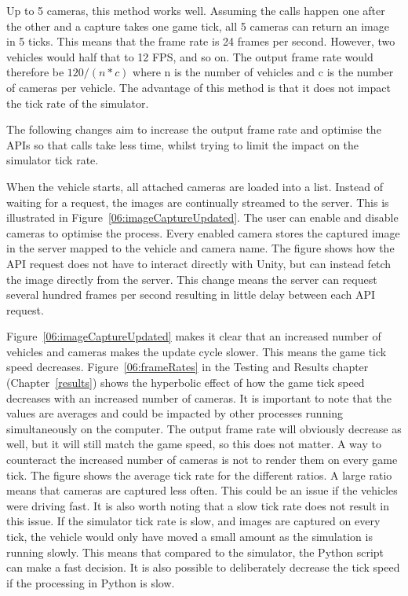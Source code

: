 Up to 5 cameras, this method works well. Assuming the calls happen one after the other and a capture takes one game tick, all 5 cameras can return an image in 5 ticks. This means that the frame rate is 24 frames per second. However, two vehicles would half that to 12 FPS, and so on. The output frame rate would therefore be $120/(n*c)$ where n is the number of vehicles and c is the number of cameras per vehicle. The advantage of this method is that it does not impact the tick rate of the simulator. 

The following changes aim to increase the output frame rate and optimise the APIs so that calls take less time, whilst trying to limit the impact on the simulator tick rate. 

When the vehicle starts, all attached cameras are loaded into a list. Instead of waiting for a request, the images are continually streamed to the server. This is illustrated in Figure~\ref{06:imageCaptureUpdated}. The user can enable and disable cameras to optimise the process. Every enabled camera stores the captured image in the server mapped to the vehicle and camera name. The figure shows how the API request does not have to interact directly with Unity, but can instead fetch the image directly from the server. This change means the server can request several hundred frames per second resulting in little delay between each API request. 

Figure~\ref{06:imageCaptureUpdated} makes it clear that an increased number of vehicles and cameras makes the update cycle slower. This means the game tick speed decreases. Figure~\ref{06:frameRates} in the Testing and Results chapter (Chapter~\ref{results}) shows the hyperbolic effect of how the game tick speed decreases with an increased number of cameras. It is important to note that the values are averages and could be impacted by other processes running simultaneously on the computer. The output frame rate will obviously decrease as well, but it will still match the game speed, so this does not matter. A way to counteract the increased number of cameras is not to render them on every game tick. The figure shows the average tick rate for the different ratios. A large ratio means that cameras are captured less often. This could be an issue if the vehicles were driving fast. It is also worth noting that a slow tick rate does not result in this issue. If the simulator tick rate is slow, and images are captured on every tick, the vehicle would only have moved a small amount as the simulation is running slowly. This means that compared to the simulator, the Python script can make a fast decision. It is also possible to deliberately decrease the tick speed if the processing in Python is slow. 

